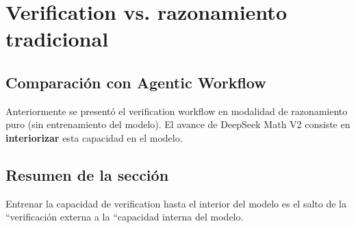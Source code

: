 \section{Verification vs. razonamiento tradicional}
\subsection{Comparación con Agentic Workflow}
Anteriormente se presentó el verification workflow en modalidad de razonamiento puro (sin entrenamiento del modelo). El avance de DeepSeek Math V2 consiste en \textbf{interiorizar} esta capacidad en el modelo.

\subsection{Resumen de la sección}
Entrenar la capacidad de verification hasta el interior del modelo es el salto de la ``verificación externa a la ``capacidad interna del modelo.

\newpage

